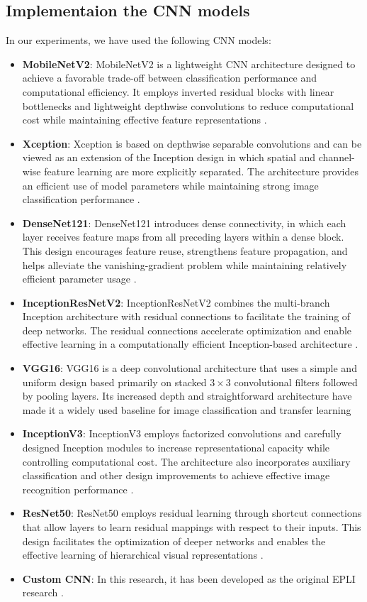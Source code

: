 \documentclass[a4paper,fleqn]{cas-dc}
\begin{document}
	
	\subsection{Implementaion the CNN models}
	\label{sec:cnn_architectures}
	In our experiments, we have used the following CNN models:
	\begin{itemize}
		\item \textbf{MobileNetV2}: MobileNetV2 is a lightweight CNN architecture designed to achieve a favorable trade-off between classification performance and computational efficiency. It employs inverted residual blocks with linear bottlenecks and lightweight depthwise convolutions to reduce computational cost while maintaining effective feature representations \cite{r35}.
		\item \textbf{Xception}: Xception is based on depthwise separable convolutions and can be viewed as an extension of the Inception design in which spatial and channel-wise feature learning are more explicitly separated. The architecture provides an efficient use of model parameters while maintaining strong image classification performance \cite {r25}.
		\item \textbf{DenseNet121}: DenseNet121 introduces dense connectivity, in which each layer receives feature maps from all preceding layers within a dense block. This design encourages feature reuse, strengthens feature propagation, and helps alleviate the vanishing-gradient problem while maintaining relatively efficient parameter usage \cite{ref36}.
		\item \textbf{InceptionResNetV2}: InceptionResNetV2 combines the multi-branch Inception architecture with residual connections to facilitate the training of deep networks. The residual connections accelerate optimization and enable effective learning in a computationally efficient Inception-based architecture \cite{ref37}. 
		\item \textbf{VGG16}: VGG16 is a deep convolutional architecture that uses a simple and uniform design based primarily on stacked $3\times3$ convolutional filters followed by pooling layers. Its increased depth and straightforward architecture have made it a widely used baseline for image classification and transfer learning \cite{ref38}
		\item \textbf{InceptionV3}: InceptionV3 employs factorized convolutions and carefully designed Inception modules to increase representational capacity while controlling computational cost. The architecture also incorporates auxiliary classification and other design improvements to achieve effective image recognition performance \cite{ref39}.
		\item \textbf{ResNet50}: ResNet50 employs residual learning through shortcut connections that allow layers to learn residual mappings with respect to their inputs. This design facilitates the optimization of deeper networks and enables the effective learning of hierarchical visual representations \cite{ref40}.
		\item \textbf{Custom CNN}: In this research, it has been developed as the original EPLI research  \cite{r26}.
	\end{itemize}
	
\end{document}
